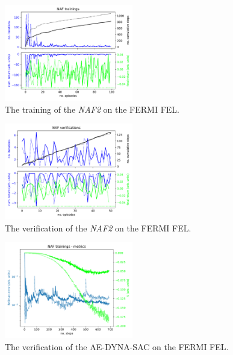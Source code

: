 \documentclass[
 reprint,
 amsmath,amssymb,amsfonts,clevref,
 aps,
prstab,
]{revtex4-2}
\begin{document}
\begin{figure}[!h]
	\centering
	\includegraphics*[width=0.5\textwidth]{Figures/FERMI_all_experiments_NAF_training_episodes.pdf}
	\caption{The training of the \emph{NAF2} on the FERMI FEL.}
	\label{fig:NAF_training}
\end{figure}

\begin{figure}[!h]
	\centering
	\includegraphics*[width=0.5\textwidth]{Figures/FERMI_all_experiments_NAF_verification_episodes.pdf}
	\caption{The verification of the \emph{NAF2} on the FERMI FEL.}
	\label{fig:NAF_verification}
\end{figure}

\begin{figure}[!h]
	\centering
	\includegraphics*[width=0.5\textwidth]{Figures/FERMI_all_experiments_NAF_convergence.pdf}
	\caption{The verification of the AE-DYNA-SAC on the FERMI FEL.}
	\label{fig:NAF_convergence}
\end{figure}
\end{document}

